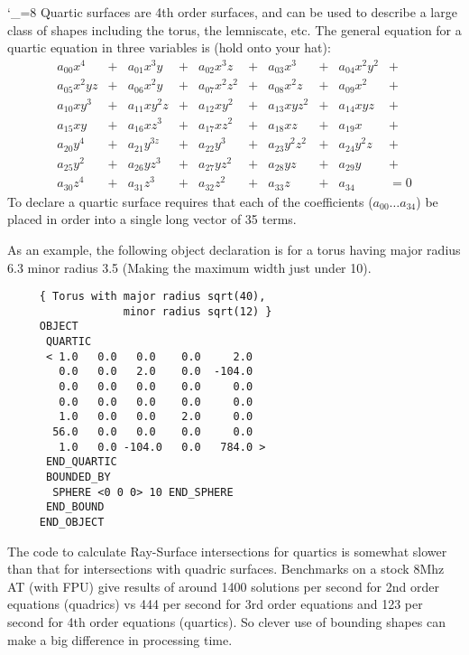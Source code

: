 \catcode`\_=8
Quartic surfaces are 4th order surfaces, and can be used to describe a large
class of shapes including the torus, the lemniscate, etc.  The general
equation for a quartic equation in three variables is (hold onto your hat):
\begin{displaymath}
\begin{array}{cccccccccccccl}
a_{00}x^{4}      & + & a_{01}x^{3}y  & + &
a_{02}x^{3}z     & + & a_{03}x^{3}   & + &
a_{04}x^{2}y^{2} & + \\
a_{05}x^{2}yz    & + & a_{06}x^{2}y  & + &
a_{07}x^{2}z^{2} & + & a_{08}x^{2}z  & + &
a_{09}x^{2}      & + \\
a_{10}xy^{3}     & + & a_{11}xy^{2}z & + &
a_{12}xy^{2}     & + & a_{13}xyz^{2} & + &
a_{14}xyz        & + \\
a_{15}xy         & + & a_{16}xz^{3}  & + &
a_{17}xz^{2}     & + & a_{18}xz      & + &
a_{19}x          & + \\
a_{20}y^{4}      & + & a_{21}y^{3z}  & + &
a_{22}y^{3}      & + & a_{23}y^{2}z^{2} & + &
a_{24}y^{2}z     & + \\
a_{25}y^{2}      & + & a_{26}yz^{3}  & + &
a_{27}yz^{2}     & + & a_{28}yz      & + &
a_{29}y          & + \\
a_{30}z^{4}      & + & a_{31}z^{3}   & + &
a_{32}z^{2}      & + & a_{33}z       & + &
a_{34}           & = 0
\end{array}
\end{displaymath}
To declare a quartic surface requires that each of the coefficients
($a_{00} \ldots a_{34}$) be placed in order into a single long vector
of 35 terms.

As an example, the following object declaration is for a torus having major
radius 6.3 minor radius 3.5 (Making the maximum width just under 10).
\begin{verbatim}
     { Torus with major radius sqrt(40),
                  minor radius sqrt(12) }
     OBJECT
      QUARTIC
      < 1.0   0.0   0.0    0.0     2.0
        0.0   0.0   2.0    0.0  -104.0
        0.0   0.0   0.0    0.0     0.0
        0.0   0.0   0.0    0.0     0.0
        1.0   0.0   0.0    2.0     0.0
       56.0   0.0   0.0    0.0     0.0
        1.0   0.0 -104.0   0.0   784.0 >
      END_QUARTIC
      BOUNDED_BY
       SPHERE <0 0 0> 10 END_SPHERE
      END_BOUND
     END_OBJECT
\end{verbatim}
The code to calculate Ray-Surface intersections for quartics is somewhat
slower than that for intersections with quadric surfaces.  Benchmarks on
a stock 8Mhz AT (with FPU) give results of around 1400 solutions per second
for 2nd order equations (quadrics) vs 444 per second for 3rd order equations
and 123 per second for 4th order equations (quartics).  So clever use of
bounding shapes can make a big difference in processing
time.


